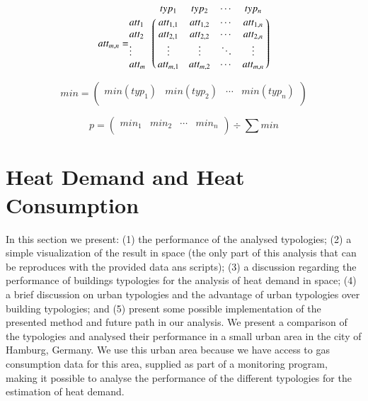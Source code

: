 \documentclass[authoryear,preprint,review,12pt]{elsarticle}
\begin{document}
\begin{linenumbers}
\begin{equation} \label{eq:att}
att_{m,n} = \bordermatrix{~ & typ_1 & typ_2 & \cdots & typ_n \cr
	att_1 & att_{1,1} & att_{1,2} & \cdots & att_{1,n} \cr
	att_2 & att_{2,1} & att_{2,2} & \cdots & att_{2,n} \cr
	\vdots & \vdots  & \vdots  & \ddots & \vdots  \cr
	att_m & att_{m,1} & att_{m,2} & \cdots & att_{m,n}}
\end{equation}

\begin{equation} \label{eq:att}
min = 
 \begin{pmatrix}
 min(typ_1) &
 min(typ_2) &
 \cdots &
 min(typ_n) \\
 \end{pmatrix}
\end{equation}

\begin{equation} \label{eq:att2}
p = 
 \begin{pmatrix}
 min_1 &
 min_2 &
 \cdots &
 min_n \\
 \end{pmatrix}
 \div \sum min
\end{equation}




\section{Heat Demand and Heat Consumption}\label{sec:result}

In this section we present: (1) the performance of the analysed typologies; (2)
a simple visualization of the result in space (the only part of this analysis
that can be reproduces with the provided data ans scripts); (3) a discussion
regarding the performance of buildings typologies for the analysis of heat
demand in space; (4) a brief discussion on urban typologies and the advantage
of urban typologies over building typologies; and (5) present some possible
implementation of the presented method and future path in our analysis.  We
present a comparison of the typologies and analysed their performance in a
small urban area in the city of Hamburg, Germany. We use this urban area
because we have access to gas consumption data for this area, supplied as part
of a monitoring program, making it possible to analyse the performance of the
different typologies for the estimation of heat demand.\\


\end{linenumbers}
\end{document}
